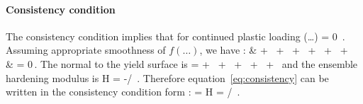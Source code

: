 \documentclass[11pt,a4paper]{article}
\begin{document}
  \paragraph{Consistency condition}
  The consistency condition implies that for continued plastic loading 
  \Beq
    (\dots) = 0 \,.
  \Eeq
  Assuming appropriate smoothness of $f(\dots)$, we have
  \Beq \label{eq:consistency}
  \Bal
  :\dot{\Bsig} & + 
      \, +
      \, +
      \,\dot{\phi^\Te} +
      \, +
      \,\dot{\Xbar^\Te} + \\
    & \quad \lambdadot{} = 0\,.
  \Eal
  \Eeq
  The normal to the yield surface is
  \BBeq
    \BN =  + \, +
      \, +
      \,\Partial{\phi^\Te}{\Bsig} +
      \, +
      \,\Partial{\Xbar^\Te}{\Bsig} 
  \BEeq
  and the ensemble hardening modulus is
  \BBeq
    H = -/\Norm{\BN}{} \,.
  \BEeq
  Therefore equation~\eqref{eq:consistency} can be written in the consistency condition form
  \Beq 
    \BNhat : \dot{\Bsig} = \lambdadot H \quad {} \quad \BNhat = \BN/\Norm{\BN}{} \,.
  \Eeq
\end{document}
